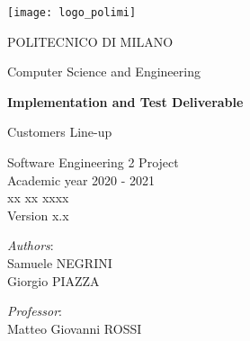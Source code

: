 \begin{titlingpage}
	\begin{center}
		\texttt{[image: logo\_polimi]}

		\vspace{0.25cm}

		\LARGE POLITECNICO DI MILANO\\

		\vspace{0.2cm}

		\Large Computer Science and Engineering

		\vspace{0.8cm}

		\Huge \textbf{Implementation and Test Deliverable}

		\vspace{0.5cm}
		\huge Customers Line-up

		\vspace{1.5cm}
		\LARGE Software Engineering 2 Project\\
		\Large Academic year 2020 - 2021\\
		\vspace{1cm}
		xx xx xxxx\\Version x.x
		\vspace{3cm}

		\large
		\begin{minipage}{.1\textwidth}
			\null
		\end{minipage}%
		\begin{minipage}{.4\textwidth}
			\textit{Authors}:\\
			Samuele NEGRINI\\
			Giorgio PIAZZA
		\end{minipage}%
		\begin{minipage}{.4\textwidth}
			\raggedleft
			\textit{Professor}:\\
			Matteo Giovanni ROSSI\\
			\phantom{placeholder}
		\end{minipage}%
		\begin{minipage}{.1\textwidth}
			\null
		\end{minipage}


		\end{center}
\end{titlingpage}
